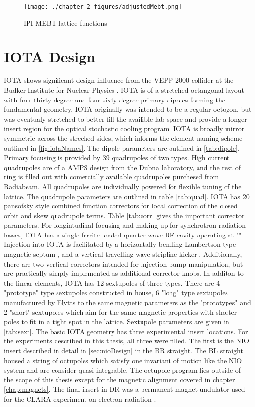 \begin{figure}
	\centering
	\texttt{[image: ./chapter\_2\_figures/adjustedMebt.png]}
	\caption{IPI MEBT lattice functions}
	\label{fig:mebtLattice}
\end{figure}

\section{IOTA Design}
IOTA shows significant design influence from the VEPP-2000 collider at the Budker Institute for Nuclear Physics \cite{vepp-2000}. IOTA is of a stretched octangonal layout with four thirty degree and four sixty degree primary dipoles forming the fundamental geometry. IOTA originally was intended to be a regular octogon, but was eventualy stretched to better fill the availible lab space and provide a longer insert region for the optical stochastic cooling program. IOTA is broadly mirror symmetric across the streched sides, which informs the element naming scheme outlined in \ref{fig:iotaNames}. The dipole parameters are outlined in \ref{tab:dipole}. Primary focusing is provided by 39 quadrupoles of two types. High current quadrupoles are of a AMPS design from the Dubna laboratory, and the rest of ring is filled out with comercially available quadrupoles purchesed from Radiabeam. All quadrupoles are individually powered for flexible tuning of the lattice. The quadrupole parameters are outlined in table \ref{tab:quad}. IOTA has 20 pansofsky \cite{panofsky} style combined function correctors for local correction of the closed orbit and skew quadrupole terms. Table \ref{tab:corr} gives the important corrector parameters. For longintudinal focusing and making up for synchrotron radiation losses, IOTA has a single ferrite loaded quarter wave RF cavity operating at "". Injection into IOTA is facilitated by a horizontally bending Lambertson type magnetic septum \cite{lambertsonPatent???}, and a vertical travelling wave stripline kicker \cite{antipovKicker}. Additionally, there are two vertical correctors intended for injection bump manipulation, but are practically simply implemented as additional corrector knobs. In additon to the linear elements, IOTA has 12 sextupoles of three types. There are 4 "prototype" type sextupoles constructed in house, 6 "long" type sextupoles manufactured by Elytts to the same magnetic parameters as the "prototypes" and 2 "short" sextupoles which aim for the same magnetic properties with shorter poles to fit in a tight spot in the lattice. Sextupole parameters are given in \ref{tab:sext}. The basic IOTA geometry has three experimental insert locations. For the experiments described in this thesis, all three were filled. The first is the NIO insert described in detail in \ref{sec:nioDesign} in the BR straight. The BL straight housed a string of octupoles which satisfy one invariant of motion like the NIO system and are consider quasi-integrable. The octupole program lies outside of the scope of this thesis except for the magnetic alignment covered in chapter \ref{chap:magnets}. The final insert in DR was a permanent magnet undulator used for the CLARA experiment on electron radiation \cite{clara}. 

